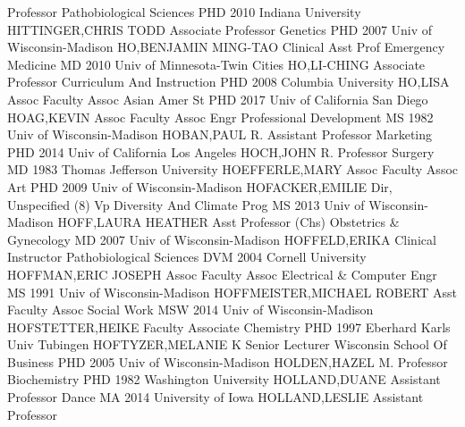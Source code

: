 \documentclass[
]{article}
\begin{document}
Professor \textbar Pathobiological Sciences \textbar PHD 2010 Indiana
University \textbar{}  \textbar HITTINGER,CHRIS TODD
\textbar Associate Professor \textbar Genetics \textbar PHD 2007 Univ of
Wisconsin-Madison \textbar{}  \textbar HO,BENJAMIN MING-TAO
\textbar Clinical Asst Prof \textbar Emergency Medicine \textbar MD 2010
Univ of Minnesota-Twin Cities \textbar{} 
\textbar HO,LI-CHING \textbar Associate Professor \textbar Curriculum
And Instruction \textbar PHD 2008 Columbia University \textbar{}
 \textbar HO,LISA \textbar Assoc Faculty Assoc
\textbar Asian Amer St \textbar PHD 2017 Univ of California San Diego
\textbar{}  \textbar HOAG,KEVIN \textbar Assoc Faculty Assoc
\textbar Engr Professional Development \textbar MS 1982 Univ of
Wisconsin-Madison \textbar{}  \textbar HOBAN,PAUL R.
\textbar Assistant Professor \textbar Marketing \textbar PHD 2014 Univ
of California Los Angeles \textbar{}  \textbar HOCH,JOHN R.
\textbar Professor \textbar Surgery \textbar MD 1983 Thomas Jefferson
University \textbar{}  \textbar HOEFFERLE,MARY
\textbar Assoc Faculty Assoc \textbar Art \textbar PHD 2009 Univ of
Wisconsin-Madison \textbar{}  \textbar HOFACKER,EMILIE
\textbar Dir, Unspecified (8) \textbar Vp Diversity And Climate Prog
\textbar MS 2013 Univ of Wisconsin-Madison \textbar{} 
\textbar HOFF,LAURA HEATHER \textbar Asst Professor (Chs)
\textbar Obstetrics \& Gynecology \textbar MD 2007 Univ of
Wisconsin-Madison \textbar{}  \textbar HOFFELD,ERIKA
\textbar Clinical Instructor \textbar Pathobiological Sciences
\textbar DVM 2004 Cornell University \textbar{} 
\textbar HOFFMAN,ERIC JOSEPH \textbar Assoc Faculty Assoc
\textbar Electrical \& Computer Engr \textbar MS 1991 Univ of
Wisconsin-Madison \textbar{}  \textbar HOFFMEISTER,MICHAEL
ROBERT \textbar Asst Faculty Assoc \textbar Social Work \textbar MSW
2014 Univ of Wisconsin-Madison \textbar{} 
\textbar HOFSTETTER,HEIKE \textbar Faculty Associate \textbar Chemistry
\textbar PHD 1997 Eberhard Karls Univ Tubingen \textbar{} 
\textbar HOFTYZER,MELANIE K \textbar Senior Lecturer \textbar Wisconsin
School Of Business \textbar PHD 2005 Univ of Wisconsin-Madison
\textbar{}  \textbar HOLDEN,HAZEL M. \textbar Professor
\textbar Biochemistry \textbar PHD 1982 Washington University \textbar{}
 \textbar HOLLAND,DUANE \textbar Assistant Professor
\textbar Dance \textbar MA 2014 University of Iowa \textbar{}
 \textbar HOLLAND,LESLIE \textbar Assistant Professor
\end{document}
